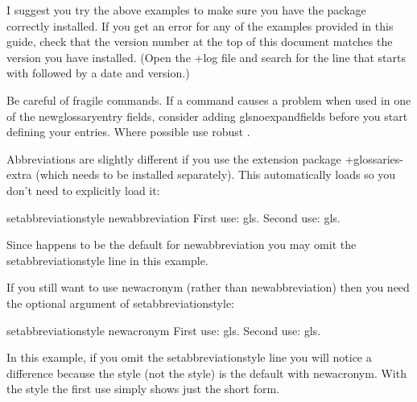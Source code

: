 \documentclass[titlepage=false,oneside,
 fontsize=12pt,captions=tableheading]{scrarticle}
\begin{document}
I suggest you try the above examples to make sure you have the
package correctly installed.  If you get an  error for any of the examples provided in this guide, check that the version
number at the top of this document matches the version you have
installed. (Open the \ext+{log} file and search for the line that
starts with  followed by a date and
version.) 

\begin{important}
Be careful of fragile commands. If a command causes a problem when
used in one of the \gls{newglossaryentry} fields, consider adding
\gls{glsnoexpandfields} before you start defining your entries.
Where possible use robust .
\end{important}

Abbreviations are slightly different if you use the extension package
\sty+{glossaries-extra} (which needs to be installed separately).
This automatically loads  so you don't need to
explicitly load it:
\begin{codebox*}
\gls{setabbreviationstyle}
\gls{newabbreviation}
First use: \gls{gls}. Second use: \gls{gls}.
\end{codebox*}
Since  happens to be the default for
\gls{newabbreviation} you may omit the \gls{setabbreviationstyle} 
line in this example.

If you still want to use \gls{newacronym} (rather than
\gls{newabbreviation}) then you need the optional
argument of \gls{setabbreviationstyle}:
\begin{codebox*}
\gls{setabbreviationstyle}
\gls{newacronym}
First use: \gls{gls}. Second use: \gls{gls}.
\end{codebox*}
In this example, if you omit the \gls{setabbreviationstyle} line you
will notice a difference because the  style (not
the  style) is the default with \gls{newacronym}.
With the  style the first use simply shows just
the short form.
\end{document}
